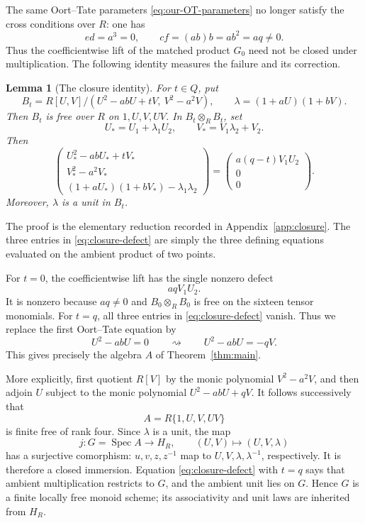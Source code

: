 \documentclass[11pt]{amsart}
\newtheorem{lemma}[theorem]{Lemma}
\theoremstyle{remark}
\newcommand{\Spec}{\operatorname{Spec}}
\newcommand{\ot}{\otimes}
\begin{document}
The same Oort--Tate parameters \eqref{eq:our-OT-parameters} no longer
satisfy the cross conditions over \(R\): one has
\[
 ed=a^3=0,
 \qquad
 cf=(ab)b=ab^2=aq\ne0.
\]
Thus the coefficientwise lift of the matched product \(G_0\) need not
be closed under multiplication.  The following identity measures the
failure and its correction.

\begin{lemma}[The closure identity]\label{lem:closure}
For \(t\in Q\), put
\[
 B_t
 =
 R[U,V]/(U^2-abU+tV,\ V^2-a^2V),
 \qquad
 \lambda=(1+aU)(1+bV).
\]
Then \(B_t\) is free over \(R\) on \(1,U,V,UV\).  In
\(B_t\ot_R B_t\), set
\[
 U_*=U_1+\lambda_1U_2,
 \qquad
 V_*=V_1\lambda_2+V_2.
\]
Then
\begin{equation}\label{eq:closure-defect}
 \begin{pmatrix}
  U_*^2-abU_*+tV_*\\
  V_*^2-a^2V_*\\
  (1+aU_*)(1+bV_*)-\lambda_1\lambda_2
 \end{pmatrix}
 =
 \begin{pmatrix}
  a(q-t)V_1U_2\\0\\0
 \end{pmatrix}.
\end{equation}
Moreover, \(\lambda\) is a unit in \(B_t\).
\end{lemma}

The proof is the elementary reduction recorded in
Appendix~\ref{app:closure}.  The three entries in
\eqref{eq:closure-defect} are simply the three defining equations
evaluated on the ambient product of two points.

For \(t=0\), the coefficientwise lift has the single nonzero defect
\[
 aqV_1U_2.
\]
It is nonzero because \(aq\ne0\) and
\(B_0\ot_RB_0\) is free on the sixteen tensor monomials.
For \(t=q\), all three entries in \eqref{eq:closure-defect} vanish.
Thus we replace the first Oort--Tate equation by
\begin{equation}\label{eq:corrected-equation}
 U^2-abU=0
 \qquad\rightsquigarrow\qquad
 U^2-abU=-qV.
\end{equation}
This gives precisely the algebra \(A\) of Theorem~\ref{thm:main}.

More explicitly, first quotient \(R[V]\) by the monic polynomial
\(V^2-a^2V\), and then adjoin \(U\) subject to the monic polynomial
\(U^2-abU+qV\).  It follows successively that
\begin{equation}\label{eq:A-basis}
 A=R\{1,U,V,UV\}
\end{equation}
is finite free of rank four.  Since \(\lambda\) is a unit, the map
\[
 j:G=\Spec A\longrightarrow H_R,
 \qquad
 (U,V)\longmapsto(U,V,\lambda)
\]
has a surjective comorphism: \(u,v,z,z^{-1}\) map to
\(U,V,\lambda,\lambda^{-1}\), respectively.  It is therefore a closed
immersion.  Equation \eqref{eq:closure-defect} with
\(t=q\) says that ambient multiplication restricts to \(G\), and the
ambient unit lies on \(G\).  Hence \(G\) is a finite locally free monoid
scheme; its associativity and unit laws are inherited from \(H_R\).
\end{document}
